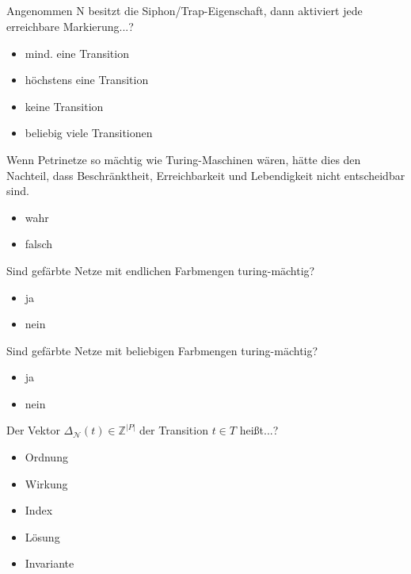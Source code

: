 \documentclass[a4paper,12pt]{scrartcl}
\begin{document}
\subsection{}
Angenommen N besitzt die Siphon/Trap-Eigenschaft, dann aktiviert jede erreichbare Markierung...?
\begin{itemize}
\item{mind. eine Transition}
\item{höchstens eine Transition}
\item{keine Transition}
\item{beliebig viele Transitionen}
\end{itemize}
Wenn Petrinetze so mächtig wie Turing-Maschinen wären, hätte dies den Nachteil, dass Beschränktheit, Erreichbarkeit und Lebendigkeit nicht entscheidbar sind.
\begin{itemize}
\item{wahr}
\item{falsch}
\end{itemize}
Sind gefärbte Netze mit endlichen Farbmengen turing-mächtig?
\begin{itemize}
\item{ja}
\item{nein}
\end{itemize}
Sind gefärbte Netze mit beliebigen Farbmengen turing-mächtig?
\begin{itemize}
\item{ja}
\item{nein}
\end{itemize}
Der Vektor $\Delta_{\mathcal{N}}(t)\in \mathds{Z}^{|P|}$ der Transition $t\in T$ heißt...?
\begin{itemize}
\item{Ordnung}
\item{Wirkung}
\item{Index}
\item{Lösung}
\item{Invariante}
\end{itemize}
\end{document}
